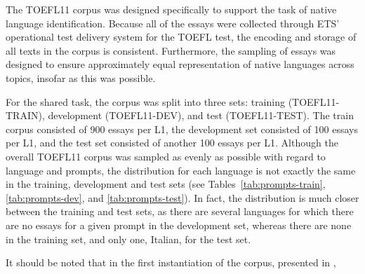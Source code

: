 \documentclass[11pt,letterpaper]{article}
\begin{document}
The TOEFL11 corpus was designed specifically to support the task of native
language identification.  Because all of the essays were collected through ETS'
operational test delivery system for the TOEFL\textsuperscript{\textregistered}
test, the encoding and storage of all texts in the corpus is consistent.
Furthermore, the sampling of essays was designed to ensure approximately equal
representation of native languages across topics, insofar as this was possible.

For the shared task, the corpus was split into three sets: training (TOEFL11-TRAIN),
development (TOEFL11-DEV), and test (TOEFL11-TEST). The train corpus consisted
of 900 essays per L1, the development set consisted of 100 essays per L1,
and the test set consisted of another 100 essays per L1.  
Although the overall TOEFL11 corpus was sampled as evenly
as possible with regard to language and prompts, the distribution for each
language is not exactly the same in the training, development and test sets (see
Tables~\ref{tab:prompts-train}, \ref{tab:prompts-dev}, and
\ref{tab:prompts-test}). In fact, the distribution is much closer between the
training and test sets, as there are several languages for which there are no
essays for a given prompt in the development set, whereas there are none in the
training set, and only one, Italian, for the test set.

It should be noted that in the first instantiation of the corpus,
presented in \cite{tetreault-EtAl:2012:PAPERS},
\end{document}
